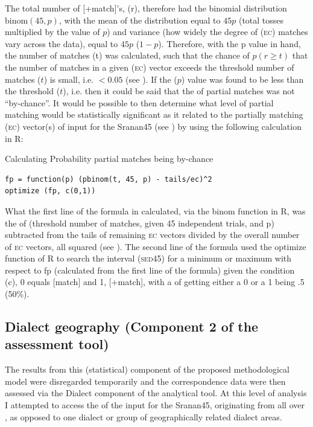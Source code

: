 {{{The total number of [+match]'s, (r), therefore had the binomial distribution $\text{binom} (45, p)$, with the mean of the distribution equal to $45p$ (total tosses multiplied by the value of $p$) and variance (how widely the degree of (\textsc{ec}) matches vary across the data), equal to $45p$ ($1-p$). Therefore, with the p value in hand, the number of matches (t) was calculated, such that the chance of $p(r \geq t)$ that the number of matches in a given (\textsc{ec}) vector exceeds the threshold number of matches ($t$) is small, i.e. $<0.05$ (see ). If the ($p$) value was found to be less than the threshold ($t$), i.e. then it could be said that the  of partial matches was not ``by-chance''. It would be possible to then determine what level of partial matching would be statistically significant as it related to the partially matching (\textsc{ec}) vector(s) of input for the Sranan45 (see ) by using the following calculation in R:

% 
\ea
\label{exTable 3.13}
{Calculating Probability partial matches being by-chance}\\
\begin{lstlisting}
fp = function(p) (pbinom(t, 45, p) - tails/ec)^2
optimize (fp, c(0,1))
\end{lstlisting}
\z

What the first line of the formula in  calculated, via the binom function in R, was the  of (threshold number of matches, given 45 independent trials, and p) subtracted from the tails  of remaining \textsc{ec} vectors divided by the overall number of \textsc{ec} vectors, all squared (see ). The second line of the formula used the optimize function of R to search the interval (\textsc{sed45}) for a minimum or maximum with respect to fp (calculated from the first line of the formula) given the condition (c), 0 equals [\textminus{}match] and 1, [+match], with a  of getting either a 0 or a 1 being .5 (50\%).

\subsection{Dialect geography (Component 2 of the assessment tool)} \label{3.4.4}
The results from this (statistical) component of the proposed methodological model were disregarded temporarily and the correspondence data were then assessed via the Dialect  component of the analytical tool. At this level of analysis I attempted to access the  of the  input for the Sranan45, originating from  all over , as opposed to one dialect or group of geographically related dialect areas.

}}}
